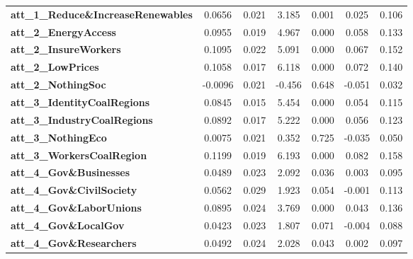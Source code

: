 \begin{center}
\begin{tabular}{lcccccc}
\textbf{att\_1\_Reduce\&IncreaseRenewables} &       0.0656  &        0.021     &     3.185  &         0.001        &        0.025    &        0.106     \\
\textbf{att\_2\_EnergyAccess}               &       0.0955  &        0.019     &     4.967  &         0.000        &        0.058    &        0.133     \\
\textbf{att\_2\_InsureWorkers}              &       0.1095  &        0.022     &     5.091  &         0.000        &        0.067    &        0.152     \\
\textbf{att\_2\_LowPrices}                  &       0.1058  &        0.017     &     6.118  &         0.000        &        0.072    &        0.140     \\
\textbf{att\_2\_NothingSoc}                 &      -0.0096  &        0.021     &    -0.456  &         0.648        &       -0.051    &        0.032     \\
\textbf{att\_3\_IdentityCoalRegions}        &       0.0845  &        0.015     &     5.454  &         0.000        &        0.054    &        0.115     \\
\textbf{att\_3\_IndustryCoalRegions}        &       0.0892  &        0.017     &     5.222  &         0.000        &        0.056    &        0.123     \\
\textbf{att\_3\_NothingEco}                 &       0.0075  &        0.021     &     0.352  &         0.725        &       -0.035    &        0.050     \\
\textbf{att\_3\_WorkersCoalRegion}          &       0.1199  &        0.019     &     6.193  &         0.000        &        0.082    &        0.158     \\
\textbf{att\_4\_Gov\&Businesses}            &       0.0489  &        0.023     &     2.092  &         0.036        &        0.003    &        0.095     \\
\textbf{att\_4\_Gov\&CivilSociety}          &       0.0562  &        0.029     &     1.923  &         0.054        &       -0.001    &        0.113     \\
\textbf{att\_4\_Gov\&LaborUnions}           &       0.0895  &        0.024     &     3.769  &         0.000        &        0.043    &        0.136     \\
\textbf{att\_4\_Gov\&LocalGov}              &       0.0423  &        0.023     &     1.807  &         0.071        &       -0.004    &        0.088     \\
\textbf{att\_4\_Gov\&Researchers}           &       0.0492  &        0.024     &     2.028  &         0.043        &        0.002    &        0.097     \\

\end{tabular}
\end{center}
